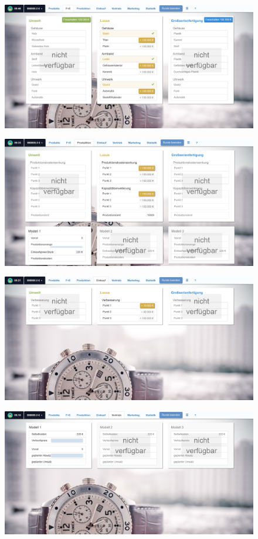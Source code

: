 \begin{figure} 
	\centering
	\includegraphics[scale=0.1]{img/bilder_layout/Spiel4.jpg} 
\end{figure}
\begin{figure} 
	\centering
	\includegraphics[scale=0.1]{img/bilder_layout/Spiel5.jpg} 
\end{figure}
\begin{figure} 
	\centering
	\includegraphics[scale=0.1]{img/bilder_layout/Spiel6.jpg} 
\end{figure}
\begin{figure} [h]
	\centering
	\includegraphics[scale=0.1]{img/bilder_layout/Spiel7.jpg} 
\end{figure}
